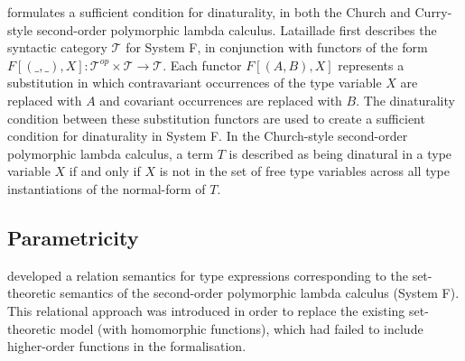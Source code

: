 \documentclass[11pt,openright,hidelinks,a4paper]{article}
\begin{document}
 formulates a sufficient condition for dinaturality, in both the Church and Curry-style second-order polymorphic lambda calculus. Lataillade first describes the syntactic category $\mathcal{T}$ for System F, in conjunction with
functors of the form $F[(\_,\_),X] : \mathcal{T}^{op} \times \mathcal{T} \rightarrow \mathcal{T}$. Each functor $F[(A,B),X]$ represents a substitution in which contravariant occurrences of the type variable $X$ are replaced with $A$ and covariant occurrences are replaced with $B$. The dinaturality condition between these substitution functors are used to create a sufficient condition for dinaturality in System F. In the Church-style second-order polymorphic lambda calculus, a term $T$ is described as being dinatural in a type variable $X$ if and only if $X$ is not in the set of free type variables across all type instantiations of the normal-form of $T$.

\subsection{Parametricity}
 developed a relation semantics for type expressions corresponding to the set-theoretic semantics of the second-order polymorphic lambda calculus (System F). This relational approach was introduced in order to replace the existing set-theoretic model (with homomorphic functions), which had failed to include higher-order functions in the formalisation.
\end{document}
